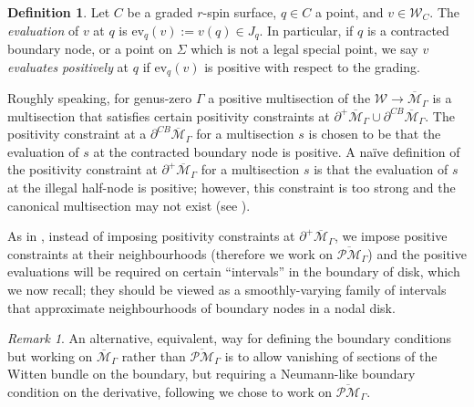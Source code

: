 \documentclass[11pt]{amsart}
\theoremstyle{definition}
\newtheorem{definition}[dummy]{Definition}
\theoremstyle{remark}
\newtheorem{rmk}[dummy]{Remark}
\newcommand{\oPMb}{{\overline{\mathcal{PM}}}}
\newcommand{\<}{\left<}
\renewcommand{\>}{\right>}
\numberwithin{equation}{section}
\def\Mbar{{\overline{\mathcal M}}}
\begin{document}
\begin{definition}
Let $C$ be a graded $r$-spin surface, $q\in C$ a point, and $v\in{\mathcal{W}}_C$. The \textit{evaluation} of $v$ at $q$ is $\text{ev}_q(v) := v(q) \in J_q$. In particular, if $q$ is a contracted boundary node, or a point on $\Sigma$ which is not a legal special point, we say $v$ \textit{evaluates positively} at $q$ if $\text{ev}_q(v)$ is positive with respect to the grading.
\end{definition}

Roughly speaking, for genus-zero $\Gamma$ a positive multisection of the  $\mathcal W\to \Mbar_\Gamma$ is a multisection that satisfies certain positivity constraints at $\partial^+\Mbar_\Gamma\cup \partial^{CB}\Mbar_\Gamma$.  The positivity constraint at a $\partial^{CB}\Mbar_\Gamma$ for a multisection $s$ is chosen to be that the evaluation of $s$ at the contracted boundary node is positive. A na\"ive definition of the positivity constraint at $\partial^+\Mbar_\Gamma$ for a multisection $s$ is that the evaluation of $s$ at the illegal half-node is positive; however, this constraint is too strong and the canonical multisection may not exist (see \cite[Example 3.23]{BCT2}).

As in \cite{BCT2}, instead of imposing 
positivity constraints at $\partial^+\Mbar_\Gamma$, we impose positive constraints at their neighbourhoods (therefore we work on $\oPMb_\Gamma$) and the positive evaluations will be required on certain ``intervals'' in the boundary of disk, which we now recall; they should be viewed as a smoothly-varying family of intervals that approximate  neighbourhoods of boundary nodes in a nodal disk. 

\begin{rmk}
    An alternative, equivalent, way for defining the boundary conditions but working on $\Mbar_{\Gamma}$ rather than $\oPMb_{\Gamma}$ is to allow vanishing of sections of the Witten bundle on the boundary, but requiring a Neumann-like boundary condition on the derivative, following \cite{BCT2}
 we chose to work on $\oPMb_{\Gamma}.$\end{rmk}
\end{document}
